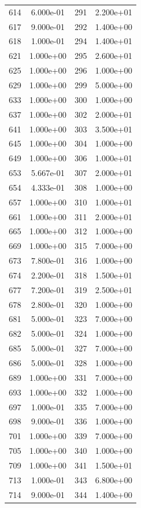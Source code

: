 \documentclass[12pt]{article}
\begin{document}
\begin{longtable}{@{}cccc@{}}
614 & 6.000e-01 & 291 & 2.200e+01 \\
617 & 9.000e-01 & 292 & 1.400e+00 \\
618 & 1.000e-01 & 294 & 1.400e+01 \\
621 & 1.000e+00 & 295 & 2.600e+01 \\
625 & 1.000e+00 & 296 & 1.000e+00 \\
629 & 1.000e+00 & 299 & 5.000e+00 \\
633 & 1.000e+00 & 300 & 1.000e+00 \\
637 & 1.000e+00 & 302 & 2.000e+01 \\
641 & 1.000e+00 & 303 & 3.500e+01 \\
645 & 1.000e+00 & 304 & 1.000e+00 \\
649 & 1.000e+00 & 306 & 1.000e+01 \\
653 & 5.667e-01 & 307 & 2.000e+01 \\
654 & 4.333e-01 & 308 & 1.000e+00 \\
657 & 1.000e+00 & 310 & 1.000e+01 \\
661 & 1.000e+00 & 311 & 2.000e+01 \\
665 & 1.000e+00 & 312 & 1.000e+00 \\
669 & 1.000e+00 & 315 & 7.000e+00 \\
673 & 7.800e-01 & 316 & 1.000e+00 \\
674 & 2.200e-01 & 318 & 1.500e+01 \\
677 & 7.200e-01 & 319 & 2.500e+01 \\
678 & 2.800e-01 & 320 & 1.000e+00 \\
681 & 5.000e-01 & 323 & 7.000e+00 \\
682 & 5.000e-01 & 324 & 1.000e+00 \\
685 & 5.000e-01 & 327 & 7.000e+00 \\
686 & 5.000e-01 & 328 & 1.000e+00 \\
689 & 1.000e+00 & 331 & 7.000e+00 \\
693 & 1.000e+00 & 332 & 1.000e+00 \\
697 & 1.000e-01 & 335 & 7.000e+00 \\
698 & 9.000e-01 & 336 & 1.000e+00 \\
701 & 1.000e+00 & 339 & 7.000e+00 \\
705 & 1.000e+00 & 340 & 1.000e+00 \\
709 & 1.000e+00 & 341 & 1.500e+01 \\
713 & 1.000e-01 & 343 & 6.800e+00 \\
714 & 9.000e-01 & 344 & 1.400e+00 \\

\end{longtable}
\end{document}
